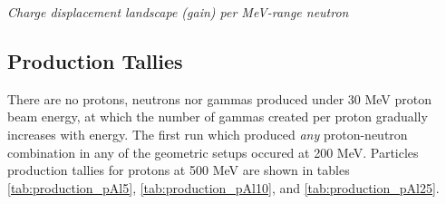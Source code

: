 \documentclass[11pt]{article}
\makeatletter
\newenvironment{figurehere}
{\def\@captype{figure}}{}
\makeatother
\begin{document}
\begin{multicols}{2}
\vspace{0.15 cm}
\begin{figurehere}
\centering
{}
\caption{\small \emph{Charge displacement landscape (gain) per MeV-range neutron}}
\label{fig:nChargeDep_Al5_MeV}
\end{figurehere}
\vspace{0.15 cm}

\end{multicols}
\newpage
\subsection{Production Tallies}

There are no protons, neutrons nor gammas produced under 30 MeV proton beam energy, at which the number of gammas created per proton gradually increases with energy.  The first run which produced \emph{any} proton-neutron combination in any of the geometric setups occured at 200 MeV.  Particles production tallies for protons at 500 MeV are shown in tables \ref{tab:production_pAl5}, \ref{tab:production_pAl10}, and \ref{tab:production_pAl25}.
\end{document}

